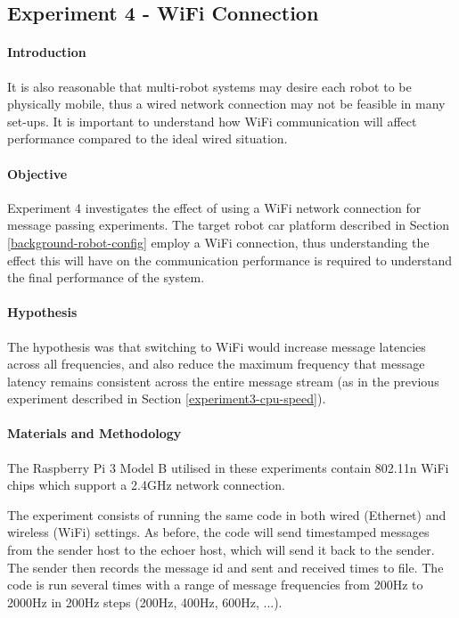 \documentclass[../dissertation.tex]{subfiles}
\begin{document}
\subsection{Experiment 4 - WiFi Connection}

\paragraph{Introduction} It is also reasonable that multi-robot systems may desire each robot to be physically mobile, thus a wired network connection may not be feasible in many set-ups. It is important to understand how WiFi communication will affect performance compared to the ideal wired situation.

\paragraph{Objective} Experiment 4 investigates the effect of using a WiFi network connection for message passing experiments. The target robot car platform described in Section \ref{background-robot-config} employ a WiFi connection, thus understanding the effect this will have on the communication performance is required to understand the final performance of the system.

\paragraph{Hypothesis} The hypothesis was that switching to WiFi would increase message latencies across all frequencies, and also reduce the maximum frequency that message latency remains consistent across the entire message stream (as in the previous experiment described in Section \ref{experiment3-cpu-speed}).

\paragraph{Materials and Methodology} The Raspberry Pi 3 Model B utilised in these experiments contain 802.11n WiFi chips which support a 2.4GHz network connection.

The experiment consists of running the same code in both wired (Ethernet) and wireless (WiFi) settings. As before, the code will send timestamped messages from the sender host to the echoer host, which will send it back to the sender. The sender then records the message id and sent and received times to file. The code is run several times with a range of message frequencies from 200Hz to 2000Hz in 200Hz steps (200Hz, 400Hz, 600Hz, ...).
\end{document}
